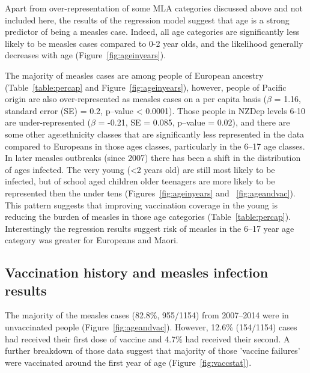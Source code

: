 \documentclass{article}
\begin{document}
\par Apart from over-representation of some MLA categories discussed above and not included here, the results of the regression model suggest that age is a strong predictor of being a measles case. Indeed, all age categories are significantly less likely to be measles cases compared to 0-2 year olds, and the likelihood generally decreases with age (Figure~\ref{fig:ageinyears}).

The majority of measles cases are among people of European ancestry (Table~\ref{table:percap} and Figure~\ref{fig:ageinyears}), however, people of Pacific origin are also over-represented as measles cases on a per capita basis ($\beta$ = 1.16, standard error (SE) = 0.2, p--value < 0.0001). Those people in NZDep levels 6-10 are under-represented ($\beta$ = -0.21, SE = 0.085, p--value = 0.02), and there are some other age:ethnicity classes that are significantly less represented in the data compared to Europeans in those ages classes, particularly in the 6--17 age classes. In later measles outbreaks (since 2007) there has been a shift in the distribution of ages infected. The very young (<2 years old) are still most likely to be infected, but of school aged children older teenagers are more likely to be represented then the under tens (Figures~\ref{fig:ageinyears} and ~\ref{fig:ageandvac}). This pattern suggests that improving vaccination coverage in the young is reducing the burden of measles in those age categories (Table~\ref{table:percap}). Interestingly the regression results suggest risk of measles in the 6--17 year age category was greater for Europeans and Maori.

\subsection{Vaccination history and measles infection results}

The majority of the measles cases (82.8\%, 955/1154) from 2007--2014 were in unvaccinated people (Figure~\ref{fig:ageandvac}). However, 12.6\% (154/1154) cases had received their first dose of vaccine and 4.7\% had received their second. A further breakdown of those data suggest that majority of those 'vaccine failures' were vaccinated around the first year of age (Figure~\ref{fig:vaccstat}).
\end{document}
